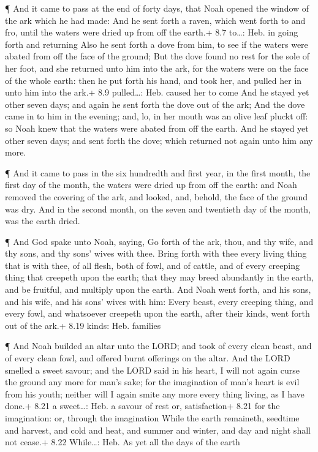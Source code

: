  ¶ And it came to pass at the end of forty days, that Noah
opened the window of the ark which he had made:  And he sent
forth a raven, which went forth to and fro, until the waters were dried
up from off the earth.+ 8.7 to\ldots: Heb. in going forth and returning
 Also he sent forth a dove from him, to see if the waters
were abated from off the face of the ground;  But the dove
found no rest for the sole of her foot, and she returned unto him into
the ark, for the waters were on the face of the whole earth: then he put
forth his hand, and took her, and pulled her in unto him into the ark.+
8.9 pulled\ldots: Heb. caused her to come  And he stayed
yet other seven days; and again he sent forth the dove out of the ark;
 And the dove came in to him in the evening; and, lo, in
her mouth was an olive leaf pluckt off: so Noah knew that the waters
were abated from off the earth.  And he stayed yet other
seven days; and sent forth the dove; which returned not again unto him
any more.

 ¶ And it came to pass in the six hundredth and first year,
in the first month, the first day of the month, the waters were dried up
from off the earth: and Noah removed the covering of the ark, and
looked, and, behold, the face of the ground was dry.  And
in the second month, on the seven and twentieth day of the month, was
the earth dried.

 ¶ And God spake unto Noah, saying,  Go forth
of the ark, thou, and thy wife, and thy sons, and thy sons' wives with
thee.  Bring forth with thee every living thing that is
with thee, of all flesh, both of fowl, and of cattle, and of every
creeping thing that creepeth upon the earth; that they may breed
abundantly in the earth, and be fruitful, and multiply upon the earth.
 And Noah went forth, and his sons, and his wife, and his
sons' wives with him:  Every beast, every creeping thing,
and every fowl, and whatsoever creepeth upon the earth, after their
kinds, went forth out of the ark.+ 8.19 kinds: Heb. families

 ¶ And Noah builded an altar unto the LORD; and took of
every clean beast, and of every clean fowl, and offered burnt offerings
on the altar.  And the LORD smelled a sweet savour; and the
LORD said in his heart, I will not again curse the ground any more for
man's sake; for the imagination of man's heart is evil from his youth;
neither will I again smite any more every thing living, as I have done.+
8.21 a sweet\ldots: Heb. a savour of rest or, satisfaction+ 8.21 for the
imagination: or, through the imagination  While the earth
remaineth, seedtime and harvest, and cold and heat, and summer and
winter, and day and night shall not cease.+ 8.22 While\ldots: Heb. As
yet all the days of the earth

